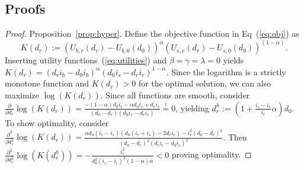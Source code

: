 \documentclass[a4paper,11pt]{article}
\newcommand{\equalD}{\overset{!}{=}}
\newcommand{\dHyp}{d^h_r}
\renewcommand{\~}[1]{\tilde{#1}}
\renewcommand{\-}[1]{\overline{#1}}
\begin{document}
\begin{appendices}
\onehalfspacing
\section{Proofs}
\normalsize

\begin{proof}{Proposition~\ref{prop:hyper}.} Define the objective function in Eq~(\ref{eq:obj}) as 
\begin{equation}\label{eq:K:gen}
    K\left(d_r\right) := 
\left(
U_{b,r}\left(d_r\right) - U_{b,0}\left(d_0\right)
\right)^\alpha
\left(
U_{s,r}\left(d_r\right) - U_{s,0}\left(d_0\right)
\right)^{\left(1-\alpha\right)}.
\end{equation}
Inserting utility functions~(\ref{eq:utilities}) and $\beta=\gamma=\lambda=0$ yields
$K(d_r)=(d_r i_b-d_0 i_b)^{\alpha } (d_0 i_s-d_r i_r)^{1-\alpha }.$ Since the logarithm is a strictly monotone function and $K\left(d_r\right)>0$ for the optimal solution, we can also maximize $\log\left(K\left(d_r\right)\right)$. Since all functions are smooth, consider $\frac{\partial }{\partial d_r}\log\left(K\left(d_r\right)\right)=\frac{-(1-\alpha) d_0 i_r-\alpha  d_0 i_s+d_r i_r}{(d_0-d_r) (d_0 i_s-d_r i_r)}\equalD 0$, yielding  $\dHyp := \left(1+\frac{i_s-i_r}{i_r}\alpha\right)d_0$. To show optimality, consider $\frac{\partial^2 }{\partial d_r^2}\log\left(K\left(d_r\right)\right)=\frac{\alpha  d_0 (i_r-i_s) (d_0 (i_r+i_s)-2 d_r i_r)-i_r^2 (d_0-d_r)^2}{(d_0-d_r)^2 (d_r i_r-d_0 i_s)^2}$. Then $\frac{\partial^2 }{\partial d_r^2}\log\left(K\left(\dHyp\right)\right)=
-\frac{i_r^2}{d_0^2 (i_s - i_r)^2 (1- \alpha) \alpha} <0$ proving optimality.
\end{proof}




\end{appendices}
\end{document}
